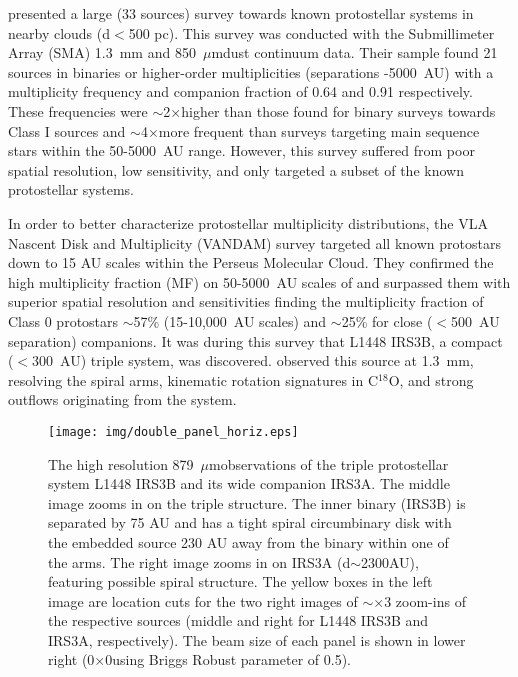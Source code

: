 \documentclass[preprint,12pt]{aastex62}
\newcommand{\ceo}{C$^{18}$O}
\renewcommand{\micron}{$\mu$m}
\newcommand{\ab}{$\sim$}
\newcommand{\x}{$\times$}
\newcommand{\contbeam}{0\farcs11$\times$0\farcs05}
\begin{document}

\citet{2013ApJ...768..110C} presented a large (33 sources) survey towards known protostellar systems in nearby clouds (d$<$500 pc). This survey was conducted with the Submillimeter Array (SMA) 1.3~mm and 850~\micron\space dust continuum data. Their sample found 21 sources in binaries or higher-order multiplicities (separations -5000~AU) with a multiplicity frequency and companion fraction of 0.64 and 0.91 respectively. These frequencies were \ab2$\times$\space higher than those found for binary surveys towards Class I sources \citep[0.46 e.g.][]{2008AJ....135.2526C} and \ab4$\times$\space more frequent than surveys targeting main sequence stars \citep[0.21; e.g.][]{1991AA...248..485D} within the 50-5000~AU range. However, this survey suffered from poor spatial resolution, low sensitivity, and only targeted a subset of the known protostellar systems.

In order to better characterize protostellar multiplicity distributions, the VLA Nascent Disk and Multiplicity (VANDAM) survey \citep{2016ApJ...818...73T} targeted all known protostars down to 15 AU scales within the Perseus Molecular Cloud. They confirmed the high multiplicity fraction (MF) on 50-5000~AU scales of \citet{2013ApJ...768..110C} and surpassed them with superior spatial resolution and sensitivities finding the multiplicity fraction of Class 0 protostars \ab57\% (15-10,000~AU scales) and \ab25\% for close ($<$500~AU separation) companions. It was during this survey that L1448 IRS3B, a compact ($<$300~AU) triple system, was discovered. \citet{2016Natur.538..483T} observed this source at 1.3~mm, resolving the spiral arms, kinematic rotation signatures in \ceo, and strong outflows originating from the system.

\begin{figure}[H]
\begin{center}
\texttt{[image: img/double\_panel\_horiz.eps]}
\end{center}
\caption{\normalsize The high resolution 879~\micron\space observations of the triple protostellar system L1448 IRS3B and its wide companion IRS3A. The middle image zooms in on the triple structure. The inner binary (IRS3B) is separated by 75 AU and has a tight spiral circumbinary disk with the embedded source 230 AU away from the binary within one of the arms. The right image zooms in on IRS3A (d\ab2300AU), featuring possible spiral structure. The yellow boxes in the left image are location cuts for the two right images of \ab\x3 zoom-ins of the respective sources (middle and right for L1448 IRS3B and IRS3A, respectively). The beam size of each panel is shown in lower right (\contbeam\space using Briggs Robust parameter of 0.5).}\label{fig:contimage}
\end{figure}
\end{document}
